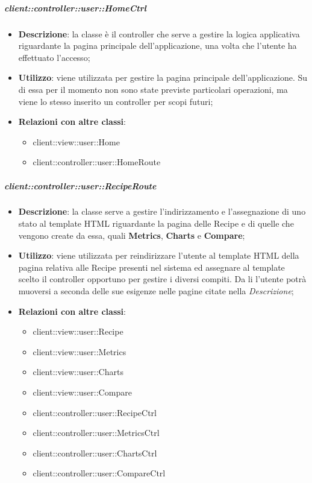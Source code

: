		\subparagraph{client::controller::user::HomeCtrl} %
		\label{subp:client_controller_user_homectrl}
			\begin{itemize}
				\item \textbf{Descrizione}: la classe è il controller che serve a gestire la logica applicativa riguardante la pagina principale dell'applicazione, una volta che l'utente ha effettuato l'accesso;
				\item \textbf{Utilizzo}: viene utilizzata per gestire la pagina principale dell'applicazione. Su di essa per il momento non sono state previste particolari operazioni, ma viene lo stesso inserito un controller per scopi futuri;
				\item \textbf{Relazioni con altre classi}:
					\begin{itemize}
						\item client::view::user::Home
						\item client::controller::user::HomeRoute
					\end{itemize}
			\end{itemize}

		\subparagraph{client::controller::user::RecipeRoute} %
		\label{subp:bdsm_app_client_controller_user_reciperouteconfig}
			\begin{itemize}
				\item \textbf{Descrizione}: la classe serve a gestire l'indirizzamento e l'assegnazione di uno stato al template HTML riguardante la pagina delle Recipe e di quelle che vengono create da essa, quali \textbf{Metrics}, \textbf{Charts} e \textbf{Compare};
				\item \textbf{Utilizzo}: viene utilizzata per reindirizzare l'utente al template HTML della pagina relativa alle Recipe presenti nel sistema ed assegnare al template scelto il controller opportuno per gestire i diversi compiti.  Da li l'utente potrà muoversi a seconda delle sue esigenze nelle pagine citate nella \emph{Descrizione};
				\item \textbf{Relazioni con altre classi}:
					\begin{itemize}
						\item client::view::user::Recipe
						\item client::view::user::Metrics
						\item client::view::user::Charts
						\item client::view::user::Compare
						\item client::controller::user::RecipeCtrl
						\item client::controller::user::MetricsCtrl
						\item client::controller::user::ChartsCtrl
						\item client::controller::user::CompareCtrl
					\end{itemize}
			\end{itemize}

